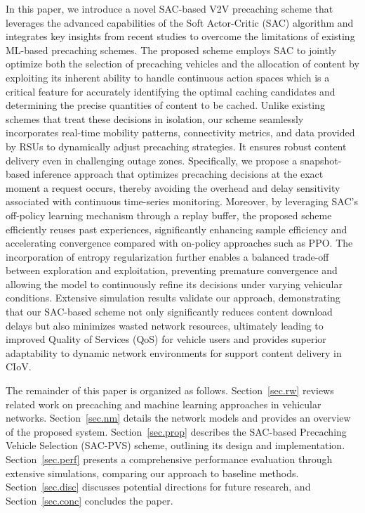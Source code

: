 \documentclass{aims}
\numberwithin{equation}{section}
\begin{document}
In this paper, we introduce a novel SAC-based V2V precaching scheme that leverages the advanced capabilities of the Soft Actor-Critic (SAC) algorithm and integrates key insights from recent studies to overcome the limitations of existing ML-based precaching schemes. The proposed scheme employs SAC to jointly optimize both the selection of precaching vehicles and the allocation of content by exploiting its inherent ability to handle continuous action spaces which is a critical feature for accurately identifying the optimal caching candidates and determining the precise quantities of content to be cached. Unlike existing schemes that treat these decisions in isolation, our scheme seamlessly incorporates real-time mobility patterns, connectivity metrics, and data provided by RSUs to dynamically adjust precaching strategies. It ensures robust content delivery even in challenging outage zones.
Specifically, we propose a snapshot-based inference approach that optimizes precaching decisions at the exact moment a request occurs, thereby avoiding the overhead and delay sensitivity associated with continuous time-series monitoring. Moreover, by leveraging SAC’s off-policy learning mechanism through a replay buffer, the proposed scheme efficiently reuses past experiences, significantly enhancing sample efficiency and accelerating convergence compared with on-policy approaches such as PPO. The incorporation of entropy regularization further enables a balanced trade-off between exploration and exploitation, preventing premature convergence and allowing the model to continuously refine its decisions under varying vehicular conditions. Extensive simulation results validate our approach, demonstrating that our SAC-based scheme not only significantly reduces content download delays but also minimizes wasted network resources, ultimately leading to improved Quality of Services (QoS) for vehicle users and provides superior adaptability to dynamic network environments for support content delivery in CIoV.

The remainder of this paper is organized as follows. Section~\ref{sec.rw} reviews related work on precaching and machine learning approaches in vehicular networks. Section~\ref{sec.nm} details the network models and provides an overview of the proposed system. Section~\ref{sec.prop} describes the SAC-based Precaching Vehicle Selection (SAC-PVS) scheme, outlining its design and implementation. Section~\ref{sec.perf} presents a comprehensive performance evaluation through extensive simulations, comparing our approach to baseline methods. Section~\ref{sec.disc} discusses potential directions for future research, and Section~\ref{sec.conc} concludes the paper.
\end{document}
